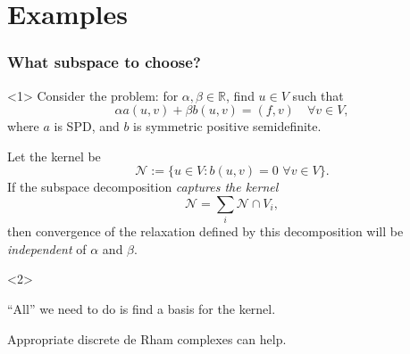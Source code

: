 \documentclass[presentation,aspectratio=43, 10pt]{beamer}
\begin{document}
\section{Examples}

\begin{frame}
  \frametitle{What subspace to choose?}
  \begin{onlyenv}<1> Consider the problem: for
    $\alpha, \beta \in \mathbb{R}$, find $u \in V$ such that
    \begin{equation*}
      \alpha a(u, v) + \beta b(u, v) = (f, v) \quad \forall v \in V,
    \end{equation*}
    where $a$ is SPD, and $b$ is symmetric positive semidefinite.
  \end{onlyenv}
  \begin{theorem}
    Let the kernel be
    \begin{equation*}
      \mathcal{N} := \{ u \in V : b(u, v) = 0 \,\, \forall v \in V \}.
    \end{equation*}
    If the subspace decomposition \emph{captures the kernel}
    \begin{equation*}
      \mathcal{N} = \sum_i \mathcal{N} \cap V_i,
    \end{equation*}
    then convergence of the relaxation defined by this decomposition
    will be \emph{independent} of $\alpha$ and $\beta$.
    \nocite{Schoeberl:1999,Lee:2007}
  \end{theorem}
  \begin{onlyenv}<2>
    \begin{corollary}
      ``All'' we need to do is find a basis for the kernel.

      Appropriate discrete de Rham complexes can help.
    \end{corollary}
  \end{onlyenv}
\end{frame}
\end{document}
